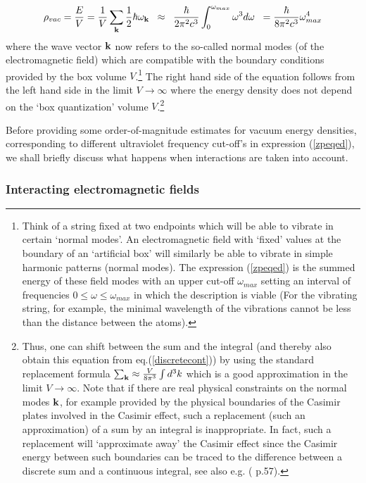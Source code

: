 \documentclass[12pt]{article}
\newcommand{\beq}{\begin{equation}}
\newcommand{\eeq}{\end{equation}}
\def\sss{\subsubsection}
\begin{document}
\beq \label{zpeqed}
\rho_{vac} = \frac{E}{V} = 
\frac{1}{V} \sum_{\bf k} \frac{1}{2} \hbar \omega_{\bf k} 
\; \; \approx \; \; \frac{\hbar}{2 \pi^2 c^3}
 \int _{0}^{\omega_{max}} \omega ^3 d\omega
\; \; = \frac{\hbar}{8 \pi^2 c^3}  \omega _{max}^4 
\eeq
where the wave vector ${\bf k}$ now refers to the so-called normal
modes (of the electromagnetic field) which are compatible with the
boundary conditions provided by the box volume $V$.\footnote{Think
of a string fixed at two endpoints which will be able to vibrate
in certain `normal modes'. An electromagnetic field with `fixed'
values at the boundary of an `artificial box' will similarly be
able to vibrate in simple harmonic patterns (normal modes). The
expression (\ref{zpeqed}) is the summed energy of these field
modes with an upper cut-off $\omega_{max}$ setting an interval of
frequencies $0 \leq \omega \leq \omega_{max}$ in which the
description is viable (For the vibrating string, for example, the
minimal wavelength of the vibrations cannot be less than the
distance between the atoms).} The right hand side of the equation
follows from the left hand side in the limit $V \rightarrow
\infty$ where the energy density does not depend on the `box
quantization' volume $V$.\footnote{Thus, one can shift between the
sum and the integral (and thereby also obtain this equation from
eq.(\ref{discretecont})) by using the standard replacement formula
$\sum_{\bf{k}} \approx \frac{V}{8\pi^3} \int d^3 k$ which is a
good approximation in the limit $V \rightarrow \infty$. Note that
if there are real physical constraints on the normal modes ${\bf
k}$, for example provided by the physical boundaries of the
Casimir plates involved in the Casimir effect, such a replacement
(such an approximation) of a sum by an integral is
inappropriate. In fact, such a replacement will `approximate away'
the Casimir effect since the Casimir energy between such
boundaries can be traced to the difference between a discrete sum
and a continuous integral, see also e.g. (\cite{milonni94} p.57).}

Before providing some order-of-magnitude
estimates for vacuum energy densities, corresponding to 
different ultraviolet frequency cut-off's in expression (\ref{zpeqed}), 
we shall briefly discuss what happens when interactions 
are taken into account. 

\sss{Interacting electromagnetic fields}
\end{document}
